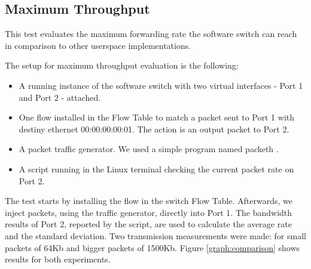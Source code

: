     \subsection{Maximum Throughput}
    \label{sec:MaxBand}
    This test evaluates the maximum forwarding rate the software switch can reach in comparison to other userspace implementations. 
    
    The setup for maximum throughput evaluation is the following:
    
    \begin{itemize}
    \item A running instance of the software switch with two virtual interfaces - Port 1 and Port 2 - attached. 
    \item One flow installed in the Flow Table to match a packet sent to Port 1 with destiny ethernet 00:00:00:00:01. The action is an output packet to Port 2. 
    \item A packet traffic generator. We used a simple program named packeth \cite{packeth}.
    \item A script running in the Linux terminal checking the current packet rate on Port 2.   
    \end{itemize}
    
    The test starts by installing the flow in the switch Flow Table. Afterwards, we inject packets, using the traffic generator, directly into Port 1. The bandwidth results of Port 2, reported by the script, are used to calculate the average rate and the standard deviation.  
    Two transmission measurements were made: for small packets of 64Kb and bigger packets of 1500Kb. Figure \ref{graph:comparison} shows results for both experiments.

